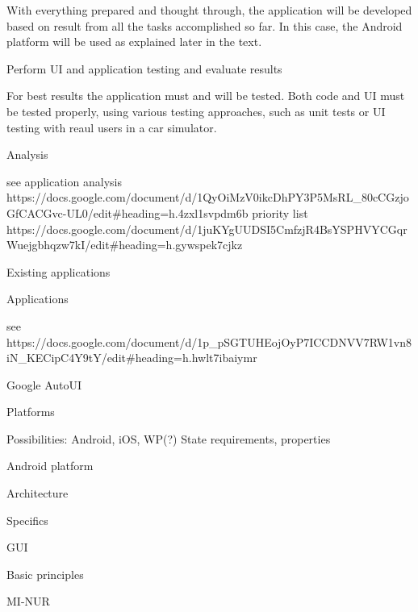 With everything prepared and thought through, the application will be developed based on result from all the tasks accomplished so far. In this case, the Android platform will be used as explained later in the text.

\secc Perform UI and application testing and evaluate results

For best results the application must and will be tested. Both code and UI must be tested properly, using various testing approaches, such as unit tests or UI testing with reaul users in a car simulator.

\chap Analysis

see application analysis https://docs.google.com/document/d/1QyOiMzV0ikcDhPY3P5MsRL_80cCGzjoGfCACGvc-UL0/edit#heading=h.4zxl1svpdm6b
priority list https://docs.google.com/document/d/1juKYgUUDSI5CmfzjR4BsYSPHVYCGqrWuejgbhqzw7kI/edit#heading=h.gywspek7cjkz

\sec Existing applications


\secc Applications

see https://docs.google.com/document/d/1p_pSGTUHEojOyP7ICCDNVV7RW1vn8iN_KECipC4Y9tY/edit#heading=h.hwlt7ibaiymr

\secc Google AutoUI


\sec Platforms

Possibilities: Android, iOS, WP(?)
State requirements, properties

\sec Android platform


\secc Architecture


\secc Specifics


\sec GUI


\secc Basic principles

MI-NUR           

